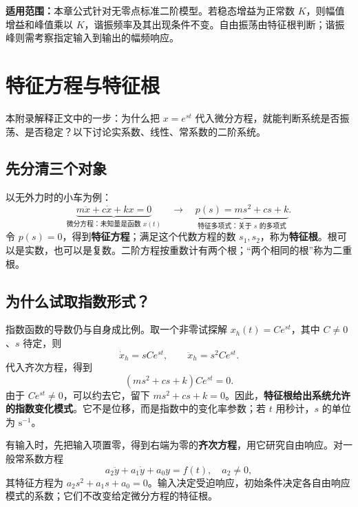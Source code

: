 \documentclass[UTF8,a4paper,11pt,fontset=windows]{ctexart}
\begin{document}
\begin{keybox}
\textbf{适用范围：}本章公式针对无零点标准二阶模型。若稳态增益为正常数 $K$，则幅值增益和峰值乘以 $K$，谐振频率及其出现条件不变。自由振荡由特征根判断；谐振峰则需考察指定输入到输出的幅频响应。
\end{keybox}

\newpage
{}
\appendix
\section{特征方程与特征根}\label{app:characteristic}

本附录解释正文中的一步：为什么把 $x=e^{st}$ 代入微分方程，就能判断系统是否振荡、是否稳定？以下讨论实系数、线性、常系数的二阶系统。

\subsection{先分清三个对象}
以无外力时的小车为例：
\[
  \underbrace{m\ddot x+c\dot x+kx=0}_{\text{微分方程：未知量是函数 }x(t)}
  \quad\longrightarrow\quad
  \underbrace{p(s)=ms^2+cs+k}_{\text{特征多项式：关于 }s\text{ 的多项式}}.
\]
令 $p(s)=0$，得到\textbf{特征方程}；满足这个代数方程的数 $s_1,s_2$，称为\textbf{特征根}。根可以是实数，也可以是复数。二阶方程按重数计有两个根；“两个相同的根”称为二重根。

\subsection{为什么试取指数形式？}
指数函数的导数仍与自身成比例。取一个非零试探解 $x_h(t)=Ce^{st}$，其中 $C\ne0$、$s$ 待定，则
\[
  \dot x_h=sCe^{st},\qquad \ddot x_h=s^2Ce^{st}.
\]
代入齐次方程，得到
\[
  (ms^2+cs+k)Ce^{st}=0.
\]
由于 $Ce^{st}\ne0$，可以约去它，留下 $ms^2+cs+k=0$。因此，\textbf{特征根给出系统允许的指数变化模式}。它不是位移，而是指数中的变化率参数；若 $t$ 用秒计，$s$ 的单位为 $\mathrm{s^{-1}}$。

有输入时，先把输入项置零，得到右端为零的\textbf{齐次方程}，用它研究自由响应。对一般常系数方程
\[
  a_2\ddot y+a_1\dot y+a_0y=f(t),\quad a_2\ne0,
\]
其特征方程为 $a_2s^2+a_1s+a_0=0$。输入决定受迫响应，初始条件决定各自由响应模式的系数；它们不改变给定微分方程的特征根。
\end{document}
